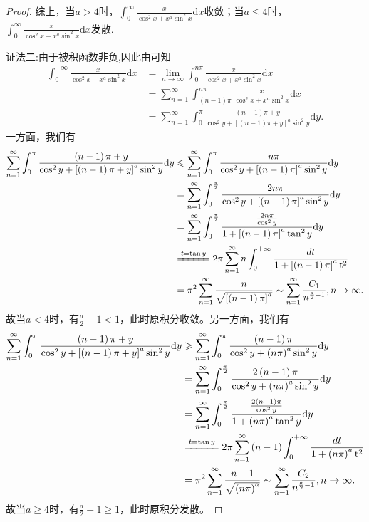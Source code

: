 \documentclass[../../main.tex]{subfiles}
\begin{document}
\begin{proof}
综上，当$a>4$时，$\int_0^{\infty}\frac{x}{\cos^2x+x^a\sin^2x}\mathrm{d}x$收敛；当$a\leqslant 4$时，$\int_0^{\infty}\frac{x}{\cos^2x+x^a\sin^2x}\mathrm{d}x$发散.

{\color{blue}证法二:}由于被积函数非负,因此由可知
\begin{align*}
\int_0^{+\infty}{\frac{x}{\cos ^2x+x^a\sin ^2x}\mathrm{d}x}&=\underset{n\rightarrow \infty}{\lim}\int_0^{n\pi}{\frac{x}{\cos ^2x+x^a\sin ^2x}\mathrm{d}x}
\\
&=\sum_{n=1}^{\infty}{\int_{\left( n-1 \right) \pi}^{n\pi}{\frac{x}{\cos ^2x+x^a\sin ^2x}\mathrm{d}x}}
\\
&=\sum_{n=1}^{\infty}{\int_0^{\pi}{\frac{\left( n-1 \right) \pi +y}{\cos ^2y+\left[ \left( n-1 \right) \pi +y \right] ^a\sin ^2y}\mathrm{d}y}}.
\end{align*}
一方面，我们有
\begin{align*}
\sum_{n=1}^{\infty}{\int_0^{\pi}{\frac{\left( n-1 \right) \pi +y}{\cos ^2y+\left[ \left( n-1 \right) \pi +y \right] ^a\sin ^2y}\mathrm{d}y}}&\leqslant \sum_{n=1}^{\infty}{\int_0^{\pi}{\frac{n\pi}{\cos ^2y+\left[ \left( n-1 \right) \pi \right] ^a\sin ^2y}\mathrm{d}y}}\\
&=\sum_{n=1}^{\infty}{\int_0^{\frac{\pi}{2}}{\frac{2n\pi}{\cos ^2y+\left[ \left( n-1 \right) \pi \right] ^a\sin ^2y}\mathrm{d}y}}\\
&=\sum_{n=1}^{\infty}{\int_0^{\frac{\pi}{2}}{\frac{\frac{2n\pi}{\cos ^2y}}{1+\left[ \left( n-1 \right) \pi \right] ^a\tan ^2y}\mathrm{d}y}}
\\
&\xlongequal{t=\tan y}2\pi \sum_{n=1}^{\infty}{n\int_0^{+\infty}{\frac{dt}{1+\left[ \left( n-1 \right) \pi \right] ^a\mathrm{t}^2}}}\\
&=\pi ^2\sum_{n=1}^{\infty}{\frac{n}{\sqrt{\left[ \left( n-1 \right) \pi \right] ^a}}}\sim \sum_{n=1}^{\infty}{\frac{C_1}{n^{\frac{a}{2}-1}}},n\rightarrow \infty .
\end{align*}
故当$a<4$时，有$\frac{a}{2}-1<1$，此时原积分收敛。另一方面，我们有
\begin{align*}
\sum_{n=1}^{\infty}{\int_0^{\pi}{\frac{\left( n-1 \right) \pi +y}{\cos ^2y+\left[ \left( n-1 \right) \pi +y \right] ^a\sin ^2y}\mathrm{d}y}}&\geqslant \sum_{n=1}^{\infty}{\int_0^{\pi}{\frac{\left( n-1 \right) \pi}{\cos ^2y+\left( n\pi \right) ^a\sin ^2y}\mathrm{d}y}}\\
&=\sum_{n=1}^{\infty}{\int_0^{\frac{\pi}{2}}{\frac{2\left( n-1 \right) \pi}{\cos ^2y+\left( n\pi \right) ^a\sin ^2y}\mathrm{d}y}}\\
&=\sum_{n=1}^{\infty}{\int_0^{\frac{\pi}{2}}{\frac{\frac{2\left( n-1 \right) \pi}{\cos ^2y}}{1+\left( n\pi \right) ^a\tan ^2y}\mathrm{d}y}}\\
&\xlongequal{t=\tan y}2\pi \sum_{n=1}^{\infty}{\left( n-1 \right) \int_0^{+\infty}{\frac{dt}{1+\left( n\pi \right) ^a\mathrm{t}^2}}}\\
&=\pi ^2\sum_{n=1}^{\infty}{\frac{n-1}{\sqrt{\left( n\pi \right) ^a}}}\sim \sum_{n=1}^{\infty}{\frac{C_2}{n^{\frac{a}{2}-1}}},n\rightarrow \infty .
\end{align*}
故当$a\geqslant 4$时，有$\frac{a}{2}-1\geqslant 1$，此时原积分发散。
\end{proof}
\end{document}
